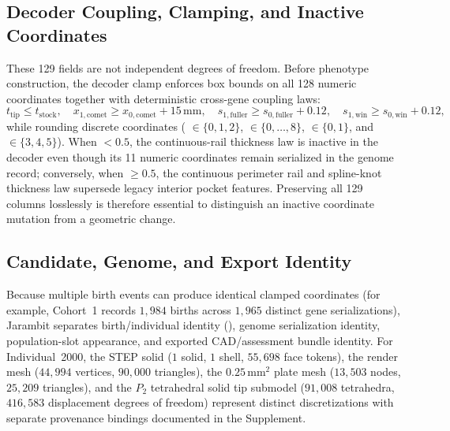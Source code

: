 \subsection{Decoder Coupling, Clamping, and Inactive Coordinates}
These 129 fields are not independent degrees of freedom. Before phenotype construction, the decoder clamp enforces box bounds on all 128 numeric coordinates together with deterministic cross-gene coupling laws:
\begin{equation}
 t_{\text{tip}} \le t_{\text{stock}},\quad x_{1,\text{comet}} \ge x_{0,\text{comet}} + 15\,\mathrm{mm},\quad s_{1,\text{fuller}} \ge s_{0,\text{fuller}} + 0.12,\quad s_{1,\text{win}} \ge s_{0,\text{win}} + 0.12,
\end{equation}
while rounding discrete coordinates ( $\in\{0,1,2\}$,  $\in\{0,\dots,8\}$,  $\in\{0,1\}$, and  $\in\{3,4,5\}$). When  $< 0.5$, the continuous-rail thickness law is inactive in the decoder even though its 11 numeric coordinates remain serialized in the genome record; conversely, when  $\ge 0.5$, the continuous perimeter rail and spline-knot thickness law supersede legacy interior pocket features. Preserving all 129 columns losslessly is therefore essential to distinguish an inactive coordinate mutation from a geometric change.

\subsection{Candidate, Genome, and Export Identity}
Because multiple birth events can produce identical clamped coordinates (for example, Cohort~1  records $1{,}984$ births across $1{,}965$ distinct gene serializations), Jarambit separates birth/individual identity (), genome serialization identity, population-slot appearance, and exported CAD/assessment bundle identity. For Individual~2000, the STEP solid ($1$ solid, $1$ shell, $55{,}698$ face tokens), the render mesh ($44{,}994$ vertices, $90{,}000$ triangles), the $0.25\,\mathrm{mm}^2$ plate mesh ($13{,}503$ nodes, $25{,}209$ triangles), and the $P_2$ tetrahedral solid tip submodel ($91{,}008$ tetrahedra, $416{,}583$ displacement degrees of freedom) represent distinct discretizations with separate provenance bindings documented in the Supplement.
